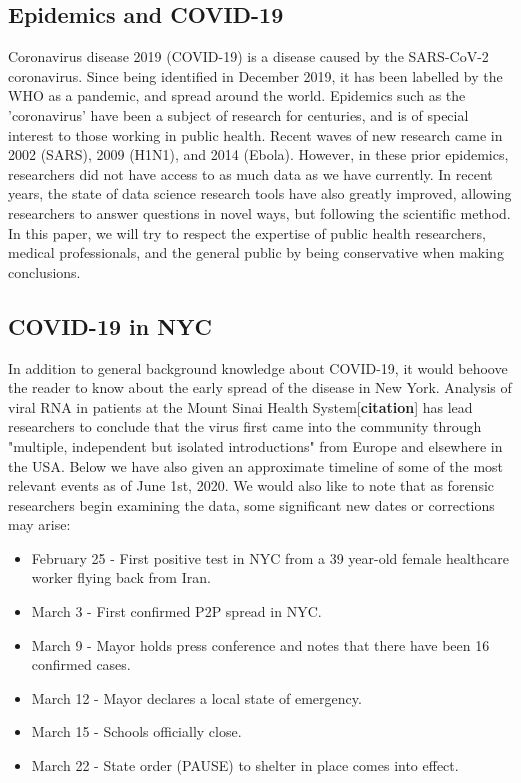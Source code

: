 \documentclass[12pt, a4, epsf] {article}
\theoremstyle{plain}
\theoremstyle{definition}
\begin{document}
\subsection*{Epidemics and COVID-19}
Coronavirus disease 2019 (COVID-19) is a disease caused by the SARS-CoV-2 coronavirus. Since being identified in December 2019, it has been labelled by the WHO as a pandemic, and spread around the world. Epidemics such as the 'coronavirus' have been a subject of research for centuries, and is of special interest to those working in public health. Recent waves of new research came in 2002 (SARS), 2009 (H1N1), and 2014 (Ebola). However, in these prior epidemics, researchers did not have access to as much data as we have currently. In recent years, the state of data science research tools have also greatly improved, allowing researchers to answer questions in novel ways, but following the scientific method. In this paper, we will try to respect the expertise of public health researchers, medical professionals, and the general public by being conservative when making conclusions.

\subsection*{COVID-19 in NYC}
In addition to general background knowledge about COVID-19, it would behoove the reader to know about the early spread of the disease in New York. Analysis of viral RNA in patients at the Mount Sinai Health System[\textbf{citation}] has lead researchers to conclude that the virus first came into the community through "multiple, independent but isolated introductions" from Europe and elsewhere in the USA. Below we have also given an approximate timeline of some of the most relevant events as of June 1st, 2020. We would also like to note that as forensic researchers begin examining the data, some significant new dates or corrections may arise:\\ 
\begin{itemize}
	\item February 25 - First positive test in NYC from a 39 year-old female healthcare worker flying back from Iran.
	\item March 3 - First confirmed P2P spread in NYC.
	\item March 9 - Mayor holds press conference and notes that there have been 16 confirmed cases.
	\item March 12 - Mayor declares a local state of emergency.
	\item March 15 - Schools officially close.
	\item March 22 - State order (PAUSE) to shelter in place comes into effect.
\end{itemize}
\end{document}
